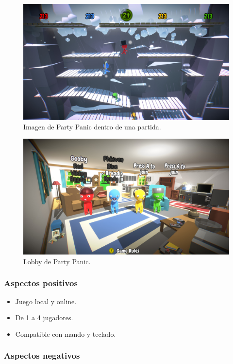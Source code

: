 \documentclass[12pt, spanish]{article}
\begin{document}
\begin{figure}[H]
  \centering
   \includegraphics[width=\textwidth]{"competencia/pp_juego2.jpg"}
	\caption{Imagen de Party Panic dentro de una partida.}
\end{figure}


\begin{figure}[H]
  \centering
   \includegraphics[width=\textwidth]{"competencia/pp_lobby.jpg"}
	\caption{Lobby de Party Panic.}
\end{figure}

\subsubsection{Aspectos positivos}

\begin{itemize}
	\item Juego local y online.
	\item De 1 a 4 jugadores.
	\item Compatible con mando y teclado.
\end{itemize}

\subsubsection{Aspectos negativos}
\end{document}
